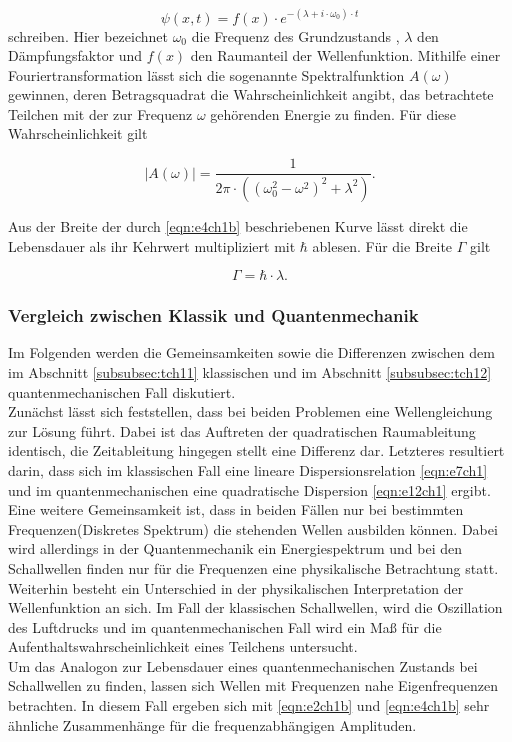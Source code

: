 \begin{equation}
  \label{eqn:e3ch1b}
  \psi(x,t) = f(x) \cdot e^{-\left( \lambda + i \cdot \omega_{0} \right) \cdot t}
\end{equation}
schreiben. Hier bezeichnet $\omega_{0}$ die Frequenz des Grundzustands , $\lambda$ den Dämpfungsfaktor und
$f(x)$ den Raumanteil der Wellenfunktion. Mithilfe einer Fouriertransformation lässt sich die sogenannte
Spektralfunktion $A(\omega)$ gewinnen, deren Betragsquadrat die Wahrscheinlichkeit angibt, das betrachtete Teilchen
mit der zur Frequenz $\omega$ gehörenden Energie zu finden.
Für diese Wahrscheinlichkeit gilt

\begin{equation}
  \label{eqn:e4ch1b}
  |A(\omega)| = \frac{1}{2\pi \cdot \left( \left( \omega_{0}^2 - \omega^2 \right)^2 + \lambda^2 \right)}.
\end{equation}

Aus der Breite der durch \eqref{eqn:e4ch1b} beschriebenen Kurve lässt direkt die Lebensdauer als ihr Kehrwert multipliziert mit $\hbar$ ablesen.
Für die Breite $\Gamma$ gilt

\begin{equation}
  \label{eqn:e5ch1b}
  \Gamma = \hbar \cdot \lambda.
\end{equation}
\subsubsection{Vergleich zwischen Klassik und Quantenmechanik}
\label{subsubsec:tch13}
Im Folgenden werden die Gemeinsamkeiten sowie die Differenzen zwischen
dem im Abschnitt \ref{subsubsec:tch11} klassischen und im Abschnitt
\ref{subsubsec:tch12} quantenmechanischen Fall diskutiert.\\
Zunächst lässt sich feststellen, dass bei beiden Problemen eine
Wellengleichung zur Lösung führt. Dabei ist das Auftreten der
quadratischen Raumableitung identisch, die Zeitableitung hingegen stellt
eine Differenz dar. Letzteres resultiert darin, dass sich im klassischen
Fall eine lineare Dispersionsrelation \eqref{eqn:e7ch1}
und im quantenmechanischen eine quadratische Dispersion \eqref{eqn:e12ch1}
ergibt.\\
Eine weitere Gemeinsamkeit ist, dass in beiden Fällen nur bei bestimmten Frequenzen(Diskretes Spektrum)
die stehenden Wellen ausbilden können. Dabei wird allerdings in der Quantenmechanik ein Energiespektrum
und bei den Schallwellen finden nur für die Frequenzen eine physikalische Betrachtung statt.
Weiterhin besteht ein Unterschied in der physikalischen Interpretation der Wellenfunktion an sich.
Im Fall der klassischen Schallwellen, wird die Oszillation des Luftdrucks und im quantenmechanischen
Fall wird ein Maß für die Aufenthaltswahrscheinlichkeit eines Teilchens untersucht.\\
Um das Analogon zur Lebensdauer eines quantenmechanischen Zustands bei Schallwellen zu finden, lassen sich
Wellen mit Frequenzen nahe Eigenfrequenzen betrachten. In diesem Fall ergeben sich mit \eqref{eqn:e2ch1b} und \eqref{eqn:e4ch1b}
sehr ähnliche Zusammenhänge für die frequenzabhängigen Amplituden.


